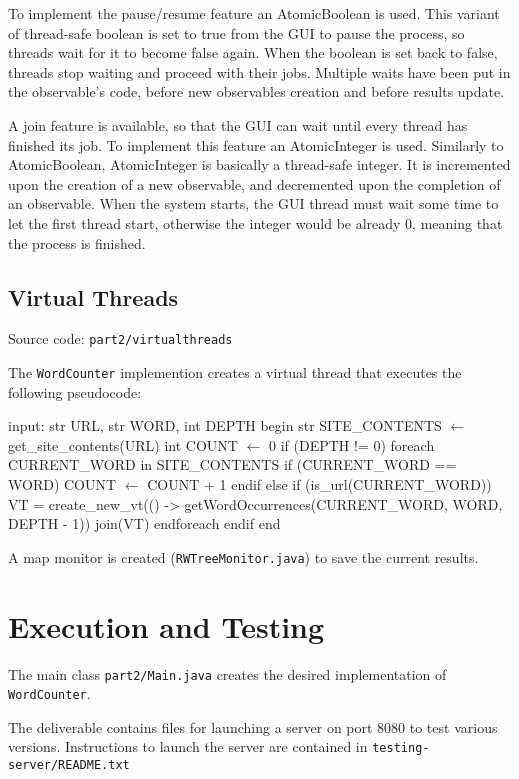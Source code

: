 \documentclass[12pt, a4paper]{report}
\begin{document}
To implement the pause/resume feature an AtomicBoolean is used.
This variant of thread-safe boolean is set to true from the GUI to pause the process, so threads wait for it to become false again.
When the boolean is set back to false, threads stop waiting and proceed with their jobs.
Multiple waits have been put in the observable's code, before new observables creation and before results update.

A join feature is available, so that the GUI can wait until every thread has finished its job.
To implement this feature an AtomicInteger is used.
Similarly to AtomicBoolean, AtomicInteger is basically a thread-safe integer. It is incremented upon the creation of a new observable, and decremented upon the completion of an observable.
When the system starts, the GUI thread must wait some time to let the first thread start, otherwise the integer would be already 0, meaning that the process is finished.

\subsection{Virtual Threads}
Source code: \texttt{part2/virtualthreads}

The \texttt{WordCounter} implemention creates a virtual thread that executes the following pseudocode:

\newpage

\begin{algorithm}[label={alg5}]
input: str URL, str WORD, int DEPTH
begin
    str SITE_CONTENTS $\gets$ get_site_contents(URL)
    int COUNT $\gets$ 0
    if (DEPTH != 0)
        foreach CURRENT_WORD in SITE_CONTENTS
            if (CURRENT_WORD == WORD)
                COUNT $\gets$ COUNT + 1
            endif
            else if (is_url(CURRENT_WORD))
                VT = create_new_vt(() -> 
                    getWordOccurrences(CURRENT_WORD, WORD, DEPTH - 1))
                join(VT)
        endforeach
    endif
end       
\end{algorithm}

A map monitor is created (\texttt{RWTreeMonitor.java}) to save the current results.

\section{Execution and Testing}
The main class \texttt{part2/Main.java} creates the desired implementation of \texttt{WordCounter}.

The deliverable contains files for launching a server on port 8080 to test various versions. Instructions to launch the server are contained in
 \texttt{testing-server/README.txt}
\end{document}
